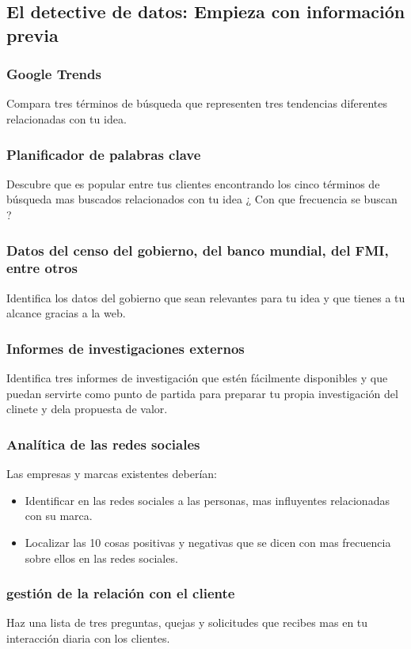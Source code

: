 \documentclass[11pt]{book}
\begin{document}
\subsection{El detective de datos: Empieza con información previa}
\subsubsection{Google Trends}
Compara tres términos de búsqueda que representen tres tendencias diferentes relacionadas con tu idea.
\subsubsection{Planificador de palabras clave}
Descubre que es popular entre tus clientes encontrando los cinco términos de búsqueda mas buscados relacionados con tu idea ¿ Con que frecuencia se buscan ?
\subsubsection{Datos del censo del gobierno, del banco mundial, del FMI, entre otros}
Identifica los datos del gobierno que sean relevantes para tu idea y que tienes a tu alcance gracias a la web.
\subsubsection{Informes de investigaciones externos}
Identifica tres informes de investigación que estén fácilmente disponibles y que puedan servirte como punto de partida para preparar tu propia investigación del clinete y dela propuesta de valor.
\subsubsection{Analítica de las redes sociales}
Las empresas y marcas existentes deberían:
\begin{itemize}
\item Identificar en las redes sociales a las personas, mas influyentes relacionadas con su marca.
\item Localizar las 10 cosas positivas y negativas que se dicen con mas frecuencia sobre ellos en las redes sociales.
\end{itemize}
\subsubsection{gestión de la relación con el cliente}
Haz una lista de tres preguntas, quejas y solicitudes que recibes mas en tu interacción diaria con los clientes.
\end{document}
